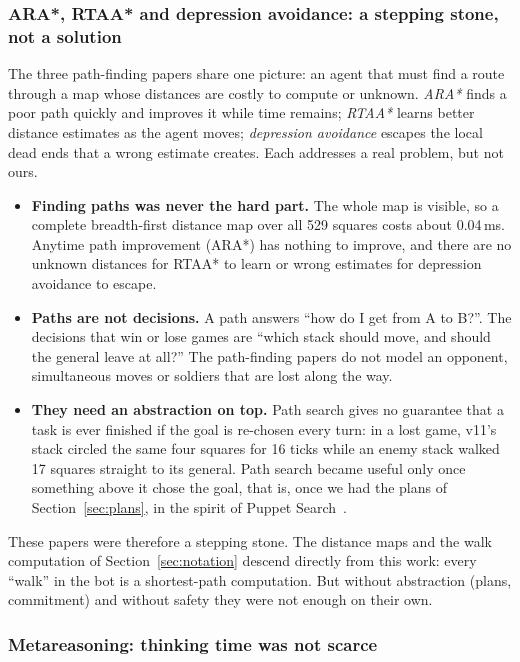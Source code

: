 \subsubsection{ARA*, RTAA* and depression avoidance: a stepping stone, not a solution}

The three path-finding papers share one picture: an agent that must find a route through a map whose distances
are costly to compute or unknown. \emph{ARA*} finds a poor path quickly and improves it while time remains;
\emph{RTAA*} learns better distance estimates as the agent moves; \emph{depression avoidance} escapes the local
dead ends that a wrong estimate creates. Each addresses a real problem, but not ours.
\begin{itemize}
\item \textbf{Finding paths was never the hard part.} The whole map is visible, so a complete breadth-first
distance map over all 529 squares costs about 0.04\,ms. Anytime path improvement (ARA*) has nothing to improve,
and there are no unknown distances for RTAA* to learn or wrong estimates for depression avoidance to escape.
\item \textbf{Paths are not decisions.} A path answers ``how do I get from A to B?''. The decisions that win or
lose games are ``which stack should move, and should the general leave at all?'' The path-finding papers do not
model an opponent, simultaneous moves or soldiers that are lost along the way.
\item \textbf{They need an abstraction on top.} Path search gives no guarantee that a task is ever finished if
the goal is re-chosen every turn: in a lost game, v11's stack circled the same four squares for 16 ticks while
an enemy stack walked 17 squares straight to its general. Path search became useful only once something above it
chose the goal, that is, once we had the plans of Section~\ref{sec:plans}, in the spirit of Puppet
Search~\cite{barriga}.
\end{itemize}
These papers were therefore a stepping stone. The distance maps and the walk computation of
Section~\ref{sec:notation} descend directly from this work: every ``walk'' in the bot is a shortest-path
computation. But without abstraction (plans, commitment) and without safety they were not enough on their own.

\subsubsection{Metareasoning: thinking time was not scarce}

